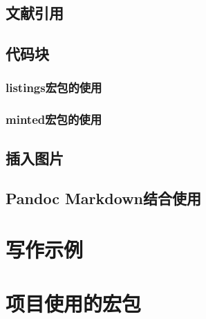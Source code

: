 \documentclass[10pt, twocolumn, compact, crimson]{uglypaper}
\begin{document}
\subsection{文献引用}


\subsection{代码块}


\subsubsection{listings宏包的使用}

\subsubsection{minted宏包的使用}


\subsection{插入图片}


\subsection{Pandoc Markdown结合使用}


\section{写作示例}



\section{项目使用的宏包}


\printbibliography[
  title=\ebibname]

\end{document}
